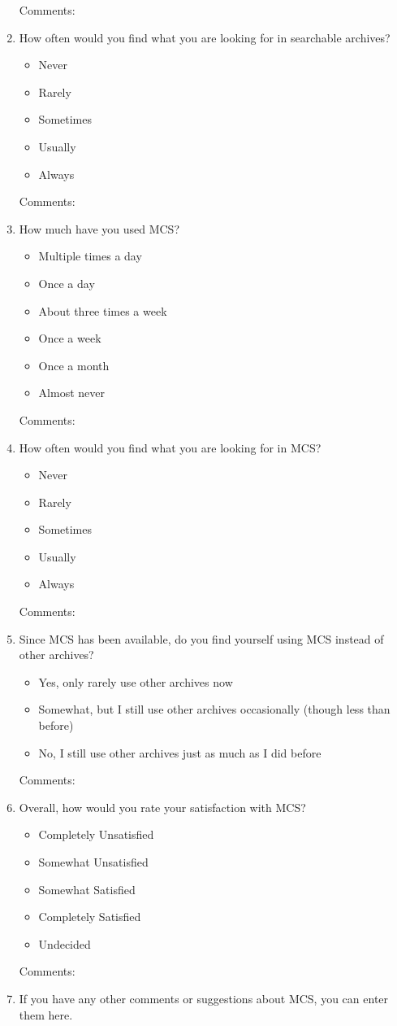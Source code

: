 \begin{enumerate}
  Comments:
\item How often would you find what you are looking for in searchable
  archives?
  \begin{itemize}
  \item Never
  \item Rarely
  \item Sometimes
  \item Usually
  \item Always
  \end{itemize}
  Comments:
\item How much have you used MCS?
  \begin{itemize}
  \item Multiple times a day
  \item Once a day
  \item About three times a week
  \item Once a week
  \item Once a month
  \item Almost never
  \end{itemize}
  Comments:
\item How often would you find what you are looking for in MCS?
  \begin{itemize}
  \item Never
  \item Rarely
  \item Sometimes
  \item Usually
  \item Always
  \end{itemize}
  Comments:
\item Since MCS has been available, do you find yourself using MCS instead of
  other archives?
  \begin{itemize}
  \item Yes, only rarely use other archives now
  \item Somewhat, but I still use other archives occasionally (though less than 
    before)
  \item No, I still use other archives just as much as I did before
  \end{itemize}
  Comments:
\item Overall, how would you rate your satisfaction with MCS?
  \begin{itemize}
  \item Completely Unsatisfied
  \item Somewhat Unsatisfied
  \item Somewhat Satisfied
  \item Completely Satisfied
  \item Undecided
  \end{itemize}
  Comments:
\item If you have any other comments or suggestions about MCS, you can enter
  them here.
\end{enumerate}


